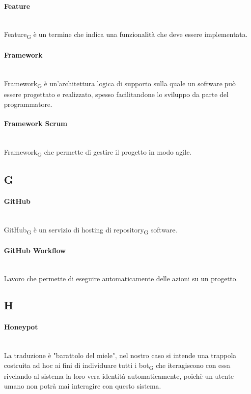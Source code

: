 \paragraph{Feature}~\smallskip \\
Feature\textsubscript{G} è un termine che indica una funzionalità che deve essere implementata.

\paragraph{Framework}~\smallskip \\
Framework\textsubscript{G} è un'architettura logica di supporto sulla quale un software può essere progettato e realizzato, spesso facilitandone lo sviluppo da parte del programmatore.

\paragraph{Framework Scrum}~\smallskip \\
Framework\textsubscript{G} che permette di gestire il progetto in modo agile.

\newpage
{}
\subsection*{G}
\paragraph{GitHub}~\smallskip \\
GitHub\textsubscript{G} è un servizio di hosting di repository\textsubscript{G} software.

\paragraph{GitHub Workflow}~\smallskip \\
Lavoro che permette di eseguire automaticamente delle azioni su un progetto.
\newpage
{}
\subsection*{H}
\paragraph{Honeypot}~\smallskip \\
La traduzione è "barattolo del miele", nel nostro caso si intende una trappola costruita ad hoc ai fini di individuare tutti i bot\textsubscript{G} che iteragiscono con essa rivelando al sistema la loro vera identità automaticamente, poichè un utente umano non potrà mai interagire con questo sistema.

